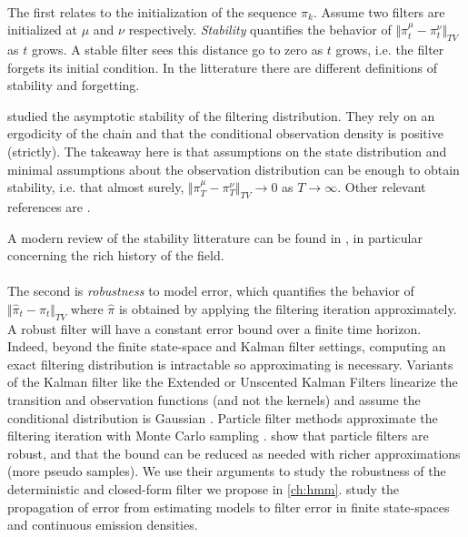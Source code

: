 \paragraph{} The first relates to the initialization of the sequence $\pi_k$. Assume two filters are initialized at $\mu$ and $\nu$ respectively. \emph{Stability} quantifies the behavior of $\Vert \pi_t^\mu - \pi_t^\nu \Vert_{TV}$ as $t$ grows. A stable filter sees this distance go to zero as $t$ grows, i.e. the filter forgets its initial condition. In the litterature there are different definitions of stability and forgetting.

\cite{ocone} studied the asymptotic stability of the filtering distribution. They rely on an ergodicity of the chain and that the conditional observation density is positive (strictly). The takeaway here is that assumptions on the state distribution and minimal assumptions about the observation distribution can be enough to obtain stability, i.e. that almost surely, $\Vert \pi_T^\mu - \pi^\nu_T\Vert_{TV} \to 0$ as $T\to\infty$. Other relevant references are \citet{atar1,chigansky,legland99,mcdonald2020}.

A modern review of the stability litterature can be found in \cite{kim2022duality}, in particular concerning the rich history of the field.

\paragraph{} The second is \emph{robustness} to model error, which quantifies the behavior of $\Vert \hat\pi_t - \pi_t\Vert_{TV}$ where $\hat \pi$ is obtained by applying the filtering iteration approximately. A robust filter will have a constant error bound over a finite time horizon. Indeed, beyond the finite state-space and Kalman filter settings, computing an exact filtering distribution is intractable so approximating is necessary. Variants of the Kalman filter like the Extended or Unscented Kalman Filters \citep{ukf,sarkka} linearize the transition and observation functions (and not the kernels) and assume the conditional distribution is Gaussian \citep{sarkka}. Particle filter methods approximate the filtering iteration with Monte Carlo sampling \citep{gordon-pf}. \citet{oudjane} show that particle filters are robust, and that the bound can be reduced as needed with richer approximations (more pseudo samples).
We use their arguments to study the robustness of the deterministic and closed-form filter we propose in \cref{ch:hmm}.
\cite{decastro2017,mitrophanov-hmm-stability-2005} study the propagation of error from estimating models to filter error in finite state-spaces and continuous emission densities.



